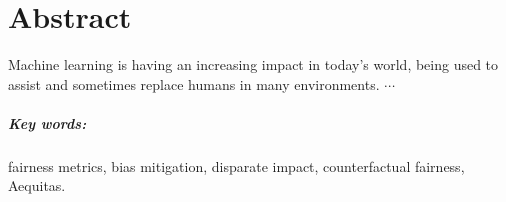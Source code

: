 \chapter*{Abstract}

Machine learning is having an increasing impact in today's world, being used to assist and sometimes replace humans in many environments. $\cdots$

\paragraph{Key words:} fairness metrics, bias mitigation, disparate impact, counterfactual fairness, Aequitas.